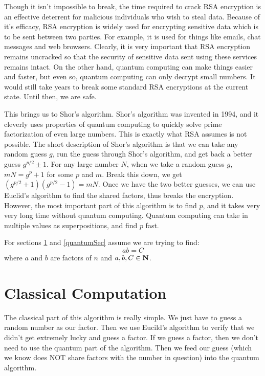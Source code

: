 \documentclass[a4paper]{article}
\begin{document}
Though it isn't impossible to break, the time required to crack RSA encryption is an effective deterrent for malicious individuals who wish to steal data.
Because of it's efficacy, RSA encryption is widely used for encrypting sensitive data which is to be sent between two parties.
For example, it is used for things like emails, chat messages and web browsers. Clearly,
it is very important that RSA encryption remains uncracked so that the security of sensitive data sent using these services remains intact.
On the other hand, quantum computing can make things easier and faster, but even so,
quantum computing can only decrypt small numbers. It would still take years to break some standard RSA encryptions at the current state.
Until then, we are safe.

This brings us to Shor's algorithm. Shor's algorithm was invented in 1994, and it cleverly uses properties of quantum computing to quickly solve prime factorization of even large numbers.
This is exactly what RSA assumes is not possible. The short description of Shor's algorithm is that we can take any random guess $g$,
run the guess through Shor's algorithm, and get back a better guess $g^{p/2} \pm 1$.
For any large number $N$, when we take a random guess $g$, $mN = g^p +1$ for some $p$ and $m$.
Break this down, we get $(g^{p/2}+1)(g^{p/2}-1) = mN$. Once we have the two better guesses,
we can use Euclid's algorithm to find the shared factors, thus breaks the encryption.
However, the most important part of this algorithm is to find $p$, and it takes very very long time without quantum computing.
Quantum computing can take in multiple values as superpositions, and find $p$ fast.

For sections \ref{classicalSec} and \ref{quantumSec} assume we are trying to find:
$$ab = C$$
where $a$ and $b$ are factors of $n$ and $a,b,C \in \mathbf{N}$.

\section{Classical Computation}
\label{classicalSec}
The classical part of this algorithm is really simple. We just have to guess a random number as our factor.
Then we use Eucild's algorithm to verify that we didn't get extremely lucky and guess a factor.
If we guess a factor, then we don't need to use the quantum part of the algorithm.
Then we feed our guess (which we know does NOT share factors with the number in question) into the quantum algorithm.
\end{document}
